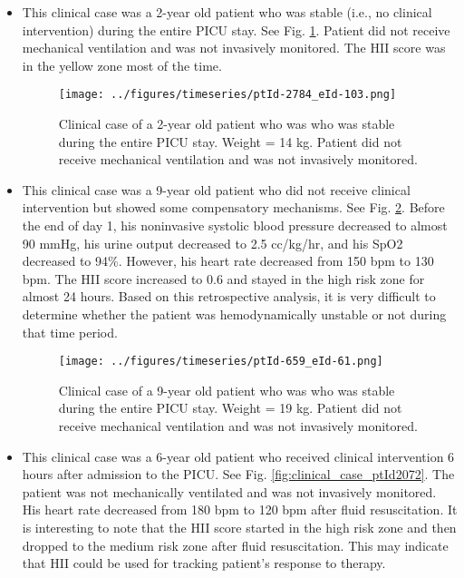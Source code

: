 \documentclass[
   technote
]{phildoc}
\newcommand{\ie}{i.e.,}
\newcommand{\hii}{HII}
\newcommand{\fig}{Fig.}
\begin{document}
\begin{itemize}
\item [c.] This clinical case was a 2-year old patient who was stable (\ie{} no clinical intervention) during the entire PICU stay. See \fig{} \ref{fig:clinical_case_ptId2784}. Patient did not receive mechanical ventilation and was not invasively monitored. The \hii{} score was in the yellow zone most of the time. 

\begin{figure}[h!]
	\centering
	\texttt{[image: ../figures/timeseries/ptId-2784\_eId-103.png]}
	\caption{Clinical case of a 2-year old patient who was who was stable during the entire PICU stay. Weight = 14 kg. Patient did not receive mechanical ventilation and was not invasively monitored.} 
	\label{fig:clinical_case_ptId2784}      
\end{figure}

\item[d.] This clinical case was a 9-year old patient who did not receive clinical intervention but showed some compensatory mechanisms. See \fig{} \ref{fig:clinical_case_ptId659}. Before the end of day 1, his noninvasive systolic blood pressure decreased to almost 90 mmHg, his urine output decreased to 2.5 cc/kg/hr, and his SpO2 decreased to 94\%. However, his heart rate decreased from 150 bpm to 130 bpm. The \hii{} score increased to 0.6 and stayed in the high risk zone for almost 24 hours. Based on this retrospective analysis, it is very difficult to determine whether the patient was hemodynamically unstable or not during that time period.         

\begin{figure}[h!]
	\centering
	\texttt{[image: ../figures/timeseries/ptId-659\_eId-61.png]}
	\caption{Clinical case of a 9-year old patient who was who was stable during the entire PICU stay. Weight = 19 kg. Patient did not receive mechanical ventilation and was not invasively monitored.} 
	\label{fig:clinical_case_ptId659}      
\end{figure}

\item[e.] This clinical case was a 6-year old patient who received clinical intervention 6 hours after admission to the PICU. See \fig{} \ref{fig:clinical_case_ptId2072}. The patient was not mechanically ventilated and was not invasively monitored. His heart rate decreased from 180 bpm to 120 bpm after fluid resuscitation. It is interesting to note that the \hii{} score started in the high risk zone and then dropped to the medium risk zone after fluid resuscitation. This may indicate that \hii{} could be used for tracking patient's response to therapy.


\end{itemize}
\end{document}
